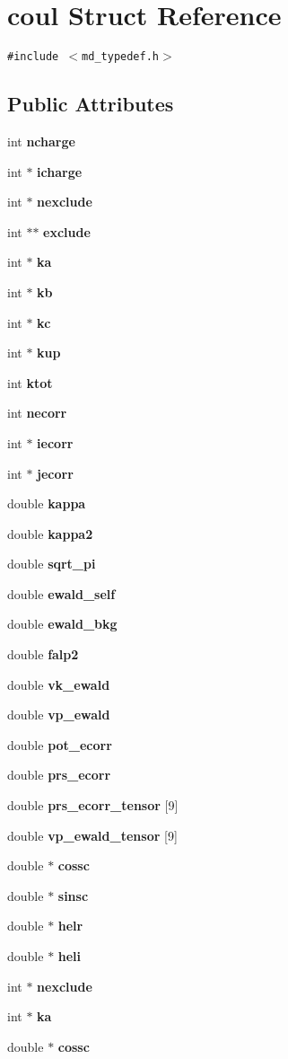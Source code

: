 \section{coul Struct Reference}
\label{structcoul}
{\tt \#include $<$md\_\-typedef.h$>$}

\subsection*{Public Attributes}
\begin{CompactItemize}
\item 
int {\bf ncharge}
\item 
int $\ast$ {\bf icharge}
\item 
int $\ast$ {\bf nexclude}
\item 
int $\ast$$\ast$ {\bf exclude}
\item 
int $\ast$ {\bf ka}
\item 
int $\ast$ {\bf kb}
\item 
int $\ast$ {\bf kc}
\item 
int $\ast$ {\bf kup}
\item 
int {\bf ktot}
\item 
int {\bf necorr}
\item 
int $\ast$ {\bf iecorr}
\item 
int $\ast$ {\bf jecorr}
\item 
double {\bf kappa}
\item 
double {\bf kappa2}
\item 
double {\bf sqrt\_\-pi}
\item 
double {\bf ewald\_\-self}
\item 
double {\bf ewald\_\-bkg}
\item 
double {\bf falp2}
\item 
double {\bf vk\_\-ewald}
\item 
double {\bf vp\_\-ewald}
\item 
double {\bf pot\_\-ecorr}
\item 
double {\bf prs\_\-ecorr}
\item 
double {\bf prs\_\-ecorr\_\-tensor} [9]
\item 
double {\bf vp\_\-ewald\_\-tensor} [9]
\item 
double $\ast$ {\bf cossc}
\item 
double $\ast$ {\bf sinsc}
\item 
double $\ast$ {\bf helr}
\item 
double $\ast$ {\bf heli}
\item 
int $\ast$ {\bf nexclude}
\item 
int $\ast$ {\bf ka}
\item 
double $\ast$ {\bf cossc}
\end{CompactItemize}


